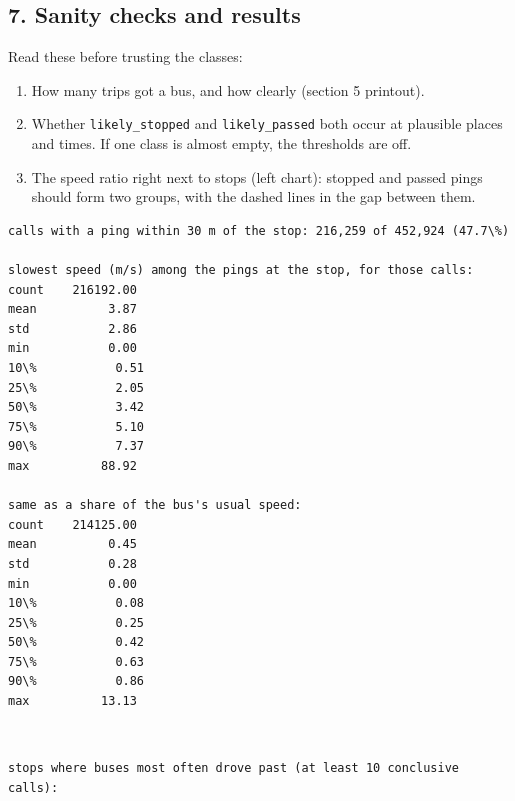\documentclass[11pt]{article}
\providecommand{\tightlist}{%
      \setlength{\itemsep}{0pt}\setlength{\parskip}{0pt}}
\begin{document}
    
    \subsection{7. Sanity checks and
results}\label{sanity-checks-and-results}

Read these before trusting the classes:

\begin{enumerate}
\def\labelenumi{\arabic{enumi}.}
\tightlist
\item
  How many trips got a bus, and how clearly (section 5 printout).
\item
  Whether \texttt{likely\_stopped} and \texttt{likely\_passed} both
  occur at plausible places and times. If one class is almost empty, the
  thresholds are off.
\item
  The speed ratio right next to stops (left chart): stopped and passed
  pings should form two groups, with the dashed lines in the gap between
  them.
\end{enumerate}

    \begin{Verbatim}[commandchars=\\\{\}]
calls with a ping within 30 m of the stop: 216,259 of 452,924 (47.7\%)

slowest speed (m/s) among the pings at the stop, for those calls:
count    216192.00
mean          3.87
std           2.86
min           0.00
10\%           0.51
25\%           2.05
50\%           3.42
75\%           5.10
90\%           7.37
max          88.92

same as a share of the bus's usual speed:
count    214125.00
mean          0.45
std           0.28
min           0.00
10\%           0.08
25\%           0.25
50\%           0.42
75\%           0.63
90\%           0.86
max          13.13
    \end{Verbatim}

    \begin{center}
    \end{center}
    { \hspace*{\fill} \\}
    
    \begin{Verbatim}[commandchars=\\\{\}]
stops where buses most often drove past (at least 10 conclusive calls):
    \end{Verbatim}
\end{document}
